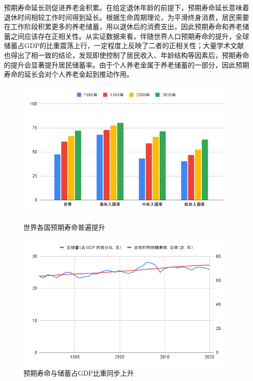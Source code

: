 \documentclass[a4paper,10.5pt]{ctexart}
\begin{document}
预期寿命延长则促进养老金积累。在给定退休年龄的前提下，预期寿命延长意味着退休时间相较工作时间得到延长。根据生命周期理论，为平滑终身消费，居民需要在工作阶段积累更多的养老储蓄，用以退休后的消费支出，因此预期寿命和养老储蓄之间应该存在正相关性。从实证数据来看，伴随世界人口预期寿命的提升，全球储蓄占GDP的比重震荡上行，一定程度上反映了二者的正相关性；大量学术文献也得出了相一致的结论\cite{bloom2003longevity,de2009life}，发现即使控制了居民收入、年龄结构等因素后，预期寿命的提升会显著提升居民储蓄率。由于个人养老金属于养老储蓄的一部分，因此预期寿命的延长会对个人养老金起到推动作用。
\begin{figure}[H]
    \begin{minipage}{0.48\linewidth}
        \includegraphics[width=\linewidth]{img/世界各国预期寿命普遍提升.png}
        \caption{世界各国预期寿命普遍提升}
    \end{minipage}
    \begin{minipage}{0.48\linewidth}
        \includegraphics[width=\linewidth]{img/人口预期寿命与储蓄占GDP比重同步上升.png}
        \caption{预期寿命与储蓄占GDP比重同步上升}
    \end{minipage}
\end{figure}
\end{document}
